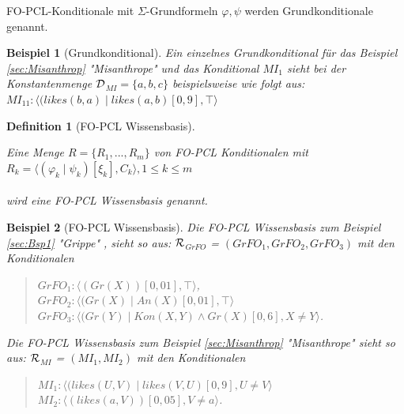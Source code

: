 \documentclass[a4paper, 11pt]{book}
\newtheorem{Def}{Definition }[section]
\newtheorem{Bsp}{Beispiel}[section]
\begin{document}
FO-PCL-Konditionale mit $ \Sigma $-Grundformeln $ \varphi, \psi $ werden Grundkonditionale genannt. \label{Grundkonditional}

\begin{Bsp}[Grundkonditional]
	Ein einzelnes Grundkonditional für das Beispiel \ref{sec:Misanthrop} "{}Misanthrope"{} und das Konditional $ MI_1 $ sieht bei der Konstantenmenge $ \cal{D} $$_{MI} = \{ a, b, c\} $ beispielsweise wie folgt aus:\\
	$ MI_{11} : \langle (likes(b, a) \mid likes(a, b
	)[0,9], \top \rangle $\\
	
\end{Bsp}

\begin{Def}[FO-PCL Wissensbasis]\cite[S. 6]{Fis12}  \label{KB}

\noindent
Eine Menge $ R = \{R_1, ..., R_m\} $ von FO-PCL Konditionalen mit\\

 $ R_k =  \langle(\varphi_k \mid \psi_k)[\xi_k], C_k \rangle , 1 \leq k \leq m $ \\
\\wird eine FO-PCL Wissensbasis genannt.
\end{Def}

\begin{Bsp}[FO-PCL Wissensbasis]
Die FO-PCL Wissensbasis zum Beispiel \ref{sec:Bsp1} "{}Grippe"{} ,
sieht so aus: $ \cal{R} $$_{GrFO}  $ = $ (GrFO_1, GrFO_2, GrFO_3)  $ mit den Konditionalen 
\begin{quote}
$ GrFO_{1}  :  \langle (Gr(X))[0,01], \top \rangle $,\\
$ GrFO_{2} : \langle (Gr(X) \mid An(X)[0,01], \top \rangle$\\
$ GrFO_{3} : \langle (Gr(Y) \mid Kon(X, Y) \wedge Gr(X )[0,6], X \neq Y \rangle$.\\
\end{quote}
Die FO-PCL Wissensbasis zum Beispiel \ref{sec:Misanthrop} "{}Misanthrope"{} sieht so aus: $ \cal{R} $$_{MI}  $ = $ (MI_1, MI_2)  $  mit den Konditionalen 
\begin{quote}
	$ MI_1 : \langle (likes(U, V) \mid likes(V, U)[0,9], U \neq V \rangle$\\
	$ MI_2 : \langle (likes(a, V))[0,05], V \neq a \rangle$.\\
\end{quote}
 	
\end{Bsp}
\end{document}
